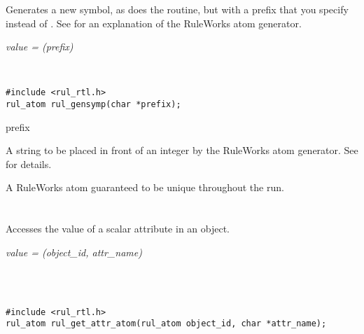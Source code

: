 Generates a new symbol, as does the  routine, but with
a prefix that you specify instead of . See  for
an explanation of the RuleWorks atom generator.

\Syntax

\it{value} = (\it{prefix})

\begin{args}
   \\
\end{args}

\CBinding
\begin{verbatim}
#include <rul_rtl.h>
rul_atom rul_gensymp(char *prefix);
\end{verbatim}

\begin{argument}
\item[prefix]

  A string to be placed in front of an integer by the RuleWorks atom
  generator. See  for details.
\end{argument}

\ReturnValue

A RuleWorks  atom guaranteed to be unique throughout the
run.

\begin{seealso}

\end{seealso}

\section*{}

Accesses the value of a scalar attribute in an object.

\Syntax

\it{value} = (\it{object\_id}, \it{attr\_name})

\begin{args}
   \\
   \\
\end{args}

\CBinding
\begin{verbatim}
#include <rul_rtl.h>
rul_atom rul_get_attr_atom(rul_atom object_id, char *attr_name);
\end{verbatim}

